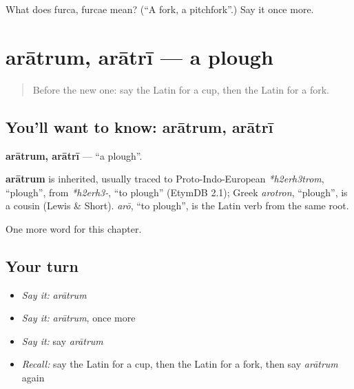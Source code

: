 \begin{tcolorbox}[breakable,colback=teal!4,colframe=teal!35!black,title={Before you move on}]
What does furca, furcae mean? (\textquotedblleft{}A fork, a pitchfork\textquotedblright{}.) Say it once more.
\end{tcolorbox}
\section[arātrum, arātrī]{arātrum, arātrī — a plough}

\label{lesson:LA-C142-aratrum}



\begin{quote}
Before the new one: say the Latin for a cup, then the Latin for a fork.
\end{quote}

\subsection*{You'll want to know: arātrum, arātrī}
\textbf{arātrum, arātrī} — \textquotedblleft{}a plough\textquotedblright{}.

\begin{cousinweb}
\textbf{arātrum} is inherited, usually traced to Proto-Indo-European \emph{*h2erh3trom}, \textquotedblleft{}plough\textquotedblright{}, from \emph{*h2erh3-}, \textquotedblleft{}to plough\textquotedblright{} (EtymDB 2.1); Greek \emph{arotron}, \textquotedblleft{}plough\textquotedblright{}, is a cousin (Lewis \& Short). \emph{arō}, \textquotedblleft{}to plough\textquotedblright{}, is the Latin verb from the same root.
\end{cousinweb}

\begin{grammarlens}[title={What you've built}]
One more word for this chapter.
\end{grammarlens}

\subsection*{Your turn}
\begin{itemize}
\raggedright
  \item \emph{Say it:} \emph{arātrum}
  \item \emph{Say it:} \emph{arātrum}, once more
  \item \emph{Say it:} say \emph{arātrum}
  \item \emph{Recall:} say the Latin for a cup, then the Latin for a fork, then say \emph{arātrum} again
\end{itemize}

